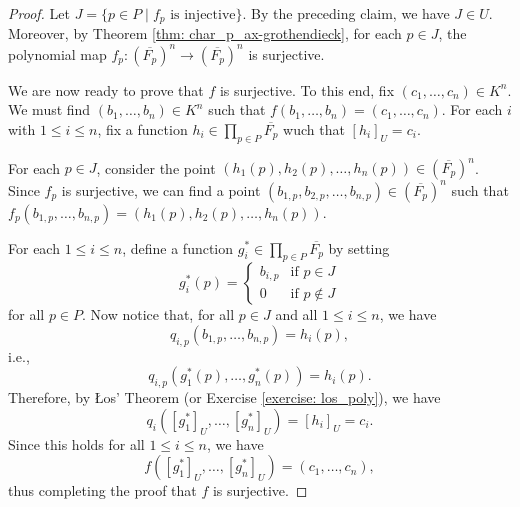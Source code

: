 \documentclass[a4paper]{memoir}
\theoremstyle{definition}
\newcommand{\ra}{\rightarrow}
\begin{document}
\begin{proof}
  Let $J = \{p \in P \mid f_p \text{ is injective}\}$. By the preceding claim, we have 
  $J \in U$. Moreover, by Theorem \ref{thm: char_p_ax-grothendieck}, for each $p \in J$, 
  the polynomial map $f_p : (\overline{F_p})^n \ra (\overline{F_p})^n$ is surjective.
  
  We are now ready to prove that $f$ is surjective. To this end, fix $(c_1, \ldots, c_n) \in 
  K^n$. We must find $(b_1, \ldots, b_n) \in K^n$ such that 
  $f(b_1, \ldots, b_n) = (c_1, \ldots, c_n)$. For each $i$ with $1 \leq i \leq n$, fix a function 
  $h_i \in \prod_{p \in P} \overline{F_p}$ wuch that $[h_i]_U = c_i$. 
  
  For each $p \in J$, consider the point $(h_1(p), h_2(p), \ldots, h_n(p)) \in 
  (\overline{F_p})^n$. Since $f_p$ is surjective, we can find a point 
  $(b_{1,p}, b_{2,p}, \ldots, b_{n,p}) \in (\overline{F_p})^n$ such that 
  $f_p(b_{1,p}, \ldots, b_{n,p}) = (h_1(p), h_2(p), \ldots, h_n(p))$.
  
  For each $1 \leq i \leq n$, define a function $g^*_i \in \prod_{p \in P} 
  \overline{F_p}$ by setting
  \[
    g^*_i(p) = \begin{cases}
      b_{i,p} & \text{if } p \in J \\ 
      0 & \text{if } p \notin J
    \end{cases}
  \]
  for all $p \in P$. Now notice that, for all $p \in J$ and all $1 \leq i \leq n$, we have
  \[
    q_{i,p}(b_{1,p}, \ldots, b_{n,p}) = h_i(p),
  \]
  i.e., 
  \[
    q_{i,p}(g^*_1(p), \ldots, g^*_n(p)) = h_i(p).
  \]
  Therefore, by \L os' Theorem (or Exercise \ref{exercise: los_poly}), we have
  \[
    q_i([g^*_1]_U, \ldots, [g^*_n]_U) = [h_i]_U = c_i.
  \]
  Since this holds for all $1 \leq i \leq n$, we have
  \[
    f([g^*_1]_U, \ldots, [g^*_n]_U) = (c_1, \ldots, c_n),
  \]
  thus completing the proof that $f$ is surjective.
\end{proof}
\end{document}
